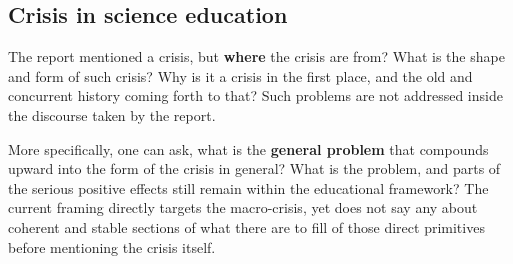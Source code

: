 \documentclass[10pt,a4paper]{article}
\begin{document}
\subsection{Crisis in science education}

The report mentioned a crisis, but \textbf{where} the crisis are from? What is the shape and form of such crisis? Why is it a crisis in the first place, and the old and concurrent history coming forth to that? Such problems are not addressed inside the discourse taken by the report.

More specifically, one can ask, what is the \textbf{general problem} that compounds upward into the form of the crisis in general? What is the problem, and parts of the serious positive effects still remain within the educational framework? The current framing directly targets the macro-crisis, yet does not say any about coherent and stable sections of what there are to fill of those direct primitives before mentioning the crisis itself. 
\end{document}
